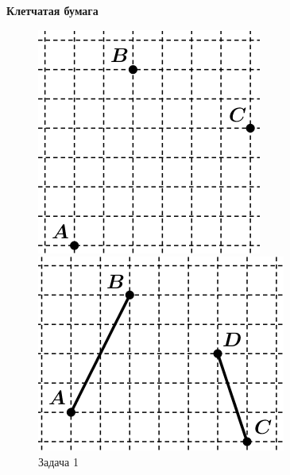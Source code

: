 \documentclass{article}
\begin{document}
\large


\begin{center}
\textbf{Клетчатая бумага}
\end{center}

\begin{figure}[h]
	\begin{center}
		\begin{minipage}[h]{0.3\linewidth}
			\includegraphics[width=1\linewidth]{1.png}
			\caption{Задача 1} %
			\label{ris:1} %
		\end{minipage}
		\hfill 
		\begin{minipage}[h]{0.3\linewidth}
			\includegraphics[width=1\linewidth]{5.png}

\end{minipage}
\end{center}
\end{figure}
\end{document}
